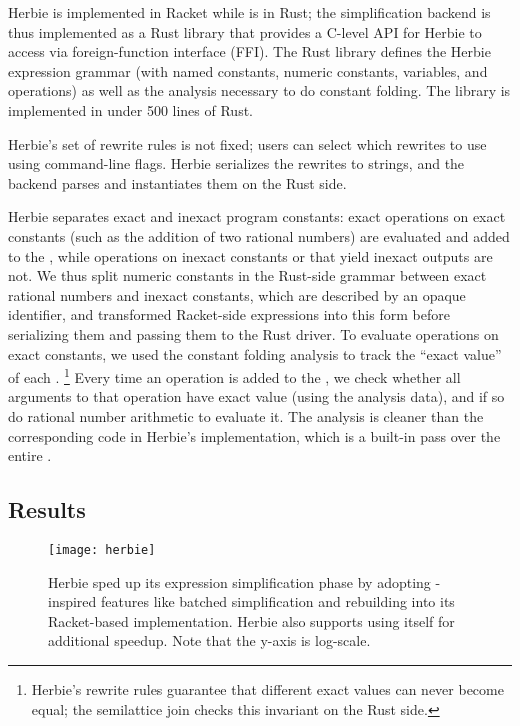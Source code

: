 Herbie is implemented in Racket while \egg is in Rust;
  the \egg simplification backend is thus implemented as a Rust library that
  provides a C-level API for Herbie to access via foreign-function interface (FFI).
The Rust library defines the Herbie expression grammar
  (with named constants, numeric constants, variables, and operations)
  as well as the \eclass analysis necessary to do constant folding.
The library is implemented in under 500 lines of Rust.

Herbie's set of rewrite rules is not fixed;
  users can select which rewrites to use using command-line flags.
Herbie serializes the rewrites to strings,
  and the \egg backend parses and instantiates them on the Rust side.

Herbie separates exact and inexact program constants:
  exact operations on exact constants
  (such as the addition of two rational numbers)
  are evaluated and added to the \egraph,
  while operations on inexact constants or that yield inexact outputs
  are not.
We thus split numeric constants in the Rust-side grammar
  between exact rational numbers and inexact constants,
  which are described by an opaque identifier,
  and transformed Racket-side expressions into this form
  before serializing them and passing them to the Rust driver.
To evaluate operations on exact constants,
  we used the constant folding \eclass analysis
  to track the ``exact value'' of each \eclass.%
\footnote{Herbie's rewrite rules guarantee that different exact values
  can never become equal; the semilattice \textsf{join} checks this invariant on the Rust side.}
Every time an operation \enode is added to the \egg \egraph,
  we check whether all arguments to that operation have exact value (using the analysis data),
  and if so do rational number arithmetic to evaluate it.
The \eclass analysis is cleaner than the corresponding code in Herbie's implementation,
  which is a built-in pass over the entire \egraph.

\subsection{Results}

\begin{figure}
  \centering
  \texttt{[image: herbie]}
  \caption{
    Herbie sped up its expression simplification phase
      by adopting \egg-inspired features like
      batched simplification and rebuilding
      into its Racket-based \egraph implementation.
    Herbie also supports using \egg itself for additional speedup.
    Note that the y-axis is log-scale.
  }
  \label{fig:herbie-results}
\end{figure}

